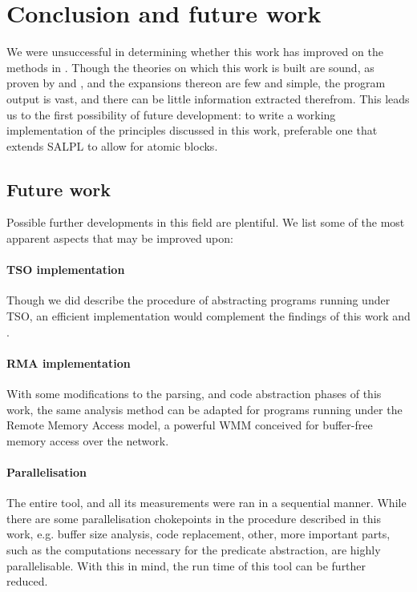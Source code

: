 \section{Conclusion and future work}

We were unsuccessful in determining whether this work has improved on the methods in \cite{danetal13}. Though the theories on which this work is built are sound, as proven by \cite{danetal13} and \cite{balletal01}, and the expansions thereon are few and simple, the program output is vast, and there can be little information extracted therefrom. This leads us to the first possibility of future development: to write a working implementation of the principles discussed in this work, preferable one that extends SALPL to allow for atomic blocks.

\subsection{Future work}

Possible further developments in this field are plentiful. We list some of the most apparent aspects that may be improved upon:

\paragraph{TSO implementation}

Though we did describe the procedure of abstracting programs running under TSO, an efficient implementation would complement the findings of this work and \cite{danetal13}.

\paragraph{RMA implementation}

With some modifications to the parsing, and code abstraction phases of this work, the same analysis method can be adapted for programs running under the Remote Memory Access model, a powerful WMM conceived for buffer-free memory access over the network.

\paragraph{Parallelisation}

The entire tool, and all its measurements were ran in a sequential manner. While there are some parallelisation chokepoints in the procedure described in this work, e.g. buffer size analysis, code replacement, other, more important parts, such as the computations necessary for the predicate abstraction, are highly parallelisable. With this in mind, the run time of this tool can be further reduced.

